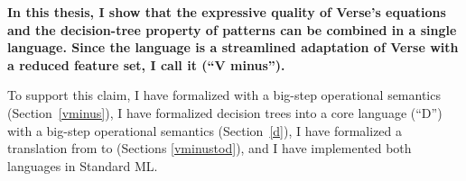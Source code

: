 \documentclass[manuscript,screen,review, 12pt, nonacm]{acmart}
\begin{document}
\bf{In this thesis, I show} that the expressive quality of Verse's equations and
the decision-tree property of patterns can be combined in a single language.
Since the language is a streamlined adaptation of Verse with a reduced feature
set, I call it \VMinus (“V minus”). 

To support this claim, I have formalized \VMinus with a big-step operational
semantics (Section~\ref{vminus}), I have formalized decision trees into a core
language \D (“D”) with a big-step operational semantics (Section~\ref{d}), 
I have formalized a translation from \VMinus to \D (Sections \ref{vminustod}),
and I have implemented both languages in Standard ML. 
\end{document}
